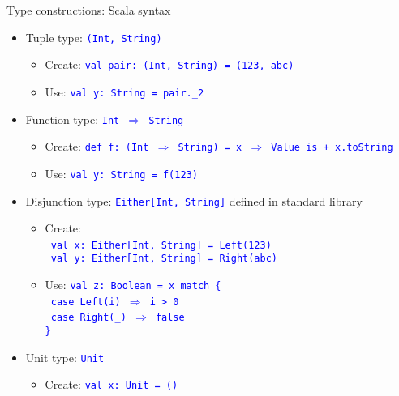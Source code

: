\documentclass[english]{beamer}
\begin{document}
\begin{frame}{Type constructions: Scala syntax}

\begin{itemize}
\item Tuple type: \texttt{\textcolor{blue}{\footnotesize{}(Int, String)}}{\footnotesize \par}
\begin{itemize}
\item Create: \texttt{\textcolor{blue}{\footnotesize{}val pair:\ (Int,
String) = (123, \textquotedbl{}abc\textquotedbl{})}} 
\item Use: \texttt{\textcolor{blue}{\footnotesize{}val y:\ String = pair.\_2}}{\footnotesize \par}
\end{itemize}
\item Function type: \texttt{\textcolor{blue}{\footnotesize{}Int $\Rightarrow$
String}}{\footnotesize \par}
\begin{itemize}
\item Create: \texttt{\textcolor{blue}{\footnotesize{}def f:\ (Int $\Rightarrow$
String) = x $\Rightarrow$ \textquotedbl{}Value is \textquotedbl{}
+ x.toString}} 
\item Use: \texttt{\textcolor{blue}{\footnotesize{}val y:\ String = f(123)}}{\footnotesize \par}
\end{itemize}
\item Disjunction type: \texttt{\textcolor{blue}{\footnotesize{}Either{[}Int,
String{]}}} defined in standard library
\begin{itemize}
\item Create:\\
 \texttt{\textcolor{blue}{\footnotesize{}\ val x:\ Either{[}Int,
String{]} = Left(123)}}~\\
\texttt{\textcolor{blue}{\footnotesize{} val y:\ Either{[}Int, String{]}
= Right(\textquotedbl{}abc\textquotedbl{})}}{\footnotesize \par}
\item Use: \texttt{\textcolor{blue}{\footnotesize{}val z:\ Boolean = x
match \{}}~\\
\texttt{\textcolor{blue}{\footnotesize{} case Left(i) $\Rightarrow$
i > 0}}~\\
\texttt{\textcolor{blue}{\footnotesize{} case Right(\_) $\Rightarrow$
false}}~\\
\texttt{\textcolor{blue}{\footnotesize{}\}}}{\footnotesize \par}
\end{itemize}
\item Unit type: \texttt{\textcolor{blue}{\footnotesize{}Unit}}{\footnotesize \par}
\begin{itemize}
\item Create: \texttt{\textcolor{blue}{\footnotesize{}val x:\ Unit = ()}}{\footnotesize \par}
\end{itemize}
\end{itemize}
\end{frame}
\end{document}
